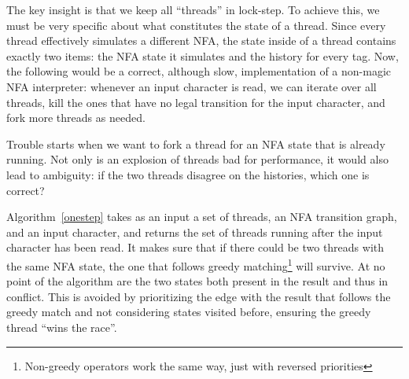 \documentclass[english]{sigplanconf}
\theoremstyle{definition}
\begin{document}
The key insight is that we keep all ``threads'' in lock-step. To
achieve this, we must be very specific about what constitutes the
state of a thread. Since every thread effectively simulates a different
NFA, the state inside of a thread contains exactly two items: the
NFA state it simulates and the history for every tag. Now, the following
would be a correct, although slow, implementation of a non-magic NFA
interpreter: whenever an input character is read, we can iterate over
all threads, kill the ones that have no legal transition for the input
character, and fork more threads as needed.

Trouble starts when we want to fork a thread for an NFA state that
is already running. Not only is an explosion of threads bad for
performance, it would also lead to ambiguity: if the two threads
disagree on the histories, which one is correct?

Algorithm~\ref{onestep}  takes as an input a set of threads, an NFA
transition graph, and an input character, and returns the set of threads
running after the input character has been read. It makes sure that
if there could be two threads with the same NFA state, the one that
follows greedy matching\footnote{Non-greedy operators work the same way, just
with reversed priorities} will survive. At no point of the algorithm are the
two states both present in the result and thus in conflict. This is avoided
by prioritizing the edge with the result that follows the greedy match and
not considering states visited before, ensuring the greedy thread 
``wins the race''.
\end{document}
